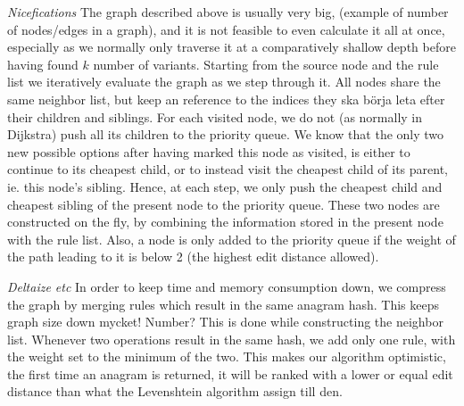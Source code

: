 \documentclass[10pt,a5paper,twoside]{article}
\begin{document}
\textit{Nicefications}
The graph described above is usually very big, (example of number of nodes/edges in a
graph), and it is not feasible to even calculate it all at once, especially as we
normally only traverse it at a comparatively shallow depth before having found $k$
number of variants.
Starting from the source node and the rule list we iteratively evaluate
the graph as we step through it. All nodes share the same neighbor list, but keep an
reference to the indices they ska börja leta efter their children and siblings.
For each visited node, we do not (as normally in Dijkstra) push all its
children to the priority queue. We know that the only two new possible options
after having marked this node as visited, is either to continue to its cheapest
child, or to instead visit the cheapest child of its parent, ie.  this node's
sibling. Hence, at each step, we only push the cheapest child and cheapest
sibling of the present node to the priority queue. 
These two nodes are constructed on the fly, by combining the information stored
in the present node with the rule list.  Also, a node is only added to the
priority queue if the weight of the path leading to it is below 2 (the highest
edit distance allowed).

\textit{Deltaize etc}
In order to keep time and memory consumption down, we compress the graph by
merging rules which result in the same anagram hash. This keeps graph size down
mycket! Number? 
This is done while constructing the neighbor list. Whenever two operations
result in the same hash, we add only one rule, with the weight set to the
minimum of the two. This makes our algorithm optimistic, the first time an
anagram is returned, it will be ranked with a lower or equal edit distance than
what the Levenshtein algorithm assign till den.

\end{document}
